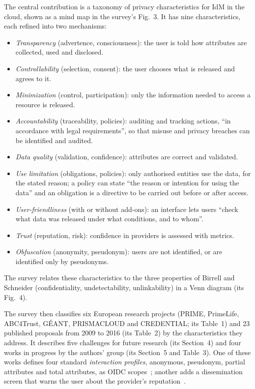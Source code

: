 The central contribution is a taxonomy of privacy characteristics for IdM in the cloud, shown as a mind map in the survey's Fig.~3. It has nine characteristics, each refined into two mechanisms:
\begin{itemize}
\item \emph{Transparency} (advertence, consciousness): the user is told how attributes are collected, used and disclosed.
\item \emph{Controllability} (selection, consent): the user chooses what is released and agrees to it.
\item \emph{Minimization} (control, participation): only the information needed to access a resource is released.
\item \emph{Accountability} (traceability, policies): auditing and tracking actions, ``in accordance with legal requirements'', so that misuse and privacy breaches can be identified and audited.
\item \emph{Data quality} (validation, confidence): attributes are correct and validated.
\item \emph{Use limitation} (obligations, policies): only authorised entities use the data, for the stated reason; a policy can state ``the reason or intention for using the data'' and an obligation is a directive to be carried out before or after access.
\item \emph{User-friendliness} (with or without add-ons): an interface lets users ``check what data was released under what conditions, and to whom''.
\item \emph{Trust} (reputation, risk): confidence in providers is assessed with metrics.
\item \emph{Obfuscation} (anonymity, pseudonym): users are not identified, or are identified only by pseudonyms.
\end{itemize}
The survey relates these characteristics to the three properties of Birrell and Schneider (confidentiality, undetectability, unlinkability) in a Venn diagram (its Fig.~4).

The survey then classifies six European research projects (PRIME, PrimeLife, ABC4Trust, GÉANT, PRISMACLOUD and CREDENTIAL; its Table~1) and 23 published proposals from 2009 to 2016 (its Table~2) by the characteristics they address. It describes five challenges for future research (its Section~4) and four works in progress by the authors' group (its Section~5 and Table~3). One of these works defines four standard \emph{interaction profiles}, anonymous, pseudonym, partial attributes and total attributes, as OIDC scopes~\cite{werner2015approach}; another adds a dissemination screen that warns the user about the provider's reputation~\cite{werner2016model}.

